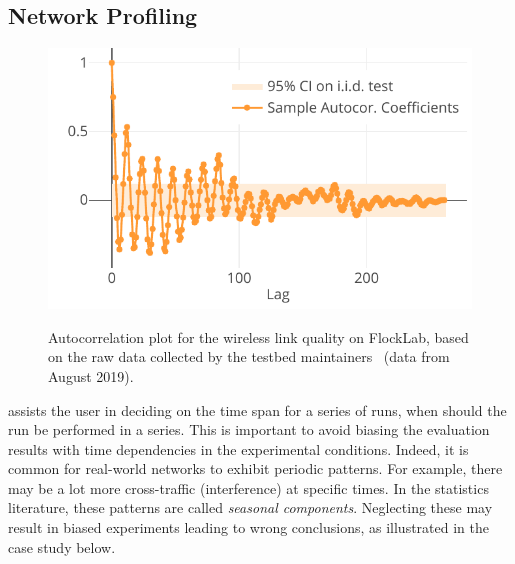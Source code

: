 \subsection{Network Profiling}
\label{subsec:network_profiling}

\begin{figure}
    \centering
   	\href{\triscalefig{Figure-4}}{
    \includegraphics[scale=1]{Figures/plot_flocklab_autocorr.pdf}}

    \caption{Autocorrelation plot for the wireless link quality on FlockLab, based on the raw data collected by the testbed maintainers~\cite{jacob2019datasetLQE} (data from August 2019).
    }
    \label{fig:flocklab_autocorr}
\end{figure}

\triscale assists the user in deciding on the time span for a series of runs, \ie when should the run be performed in a series. This is important to avoid biasing the evaluation results with time dependencies in the experimental conditions.
Indeed, it is common for real-world networks to exhibit periodic patterns.
For example, there may be a lot more cross-traffic (\ie interference) at specific times. In the statistics literature, these patterns are called \emph{seasonal components}.
Neglecting these may result in biased experiments leading to wrong conclusions, as illustrated in the case study below.

